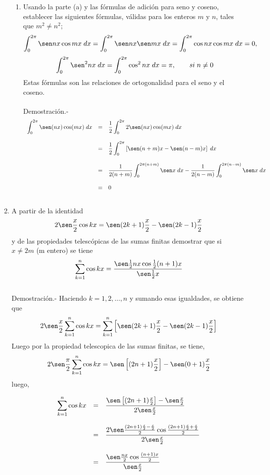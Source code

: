 \begin{enumerate}[\bfseries 1.]
\begin{enumerate}[\bfseries (a)]
    \item Usando la parte (a) y las fórmulas de adición para seno y coseno, establecer las siguientes fórmulas, válidas para los enteros $m$ y $n$, tales que $m^2 \neq n^2$;
	$$\int_0^{2\pi} \sen nx \cos mx \; dx = \int_0^{2\pi} \sen nx \sen mx \; dx = \int_0^{2\pi} \cos nx \cos mx \; dx = 0,$$
	$$\int_0^{2\pi} \sen^2 nx \; dx = \int_0^{2\pi} \cos^2 nx \; dx = \pi, \qquad si \; n\neq 0$$
	Estas fórmulas son las relaciones de ortogonalidad para el seno y el coseno.\\\\
	Demostración.-\; 
	$$\begin{array}{rcl}
	    \displaystyle\int_0^{2\pi} \sen(nx)\cos(mx)\; dx&=&\dfrac{1}{2}\displaystyle\int_0^{2\pi}2\sen(nx)\cos(mx)\; dx\\\\
							    &=&\dfrac{1}{2}\displaystyle\int_0^{2\pi} \left[\sen(n+m)x - \sen(n-m)x\right]\; dx\\\\
							    &=&\dfrac{1}{2(n+m)}\displaystyle\int_0^{2\pi(n+m)} \sen x\; dx - \dfrac{1}{2(n-m)}\displaystyle\int_0^{2\pi(n-m)} \sen x\; dx\\\\
							    &=&0\\\\
	\end{array}$$

\end{enumerate}

\item A partir de la identidad 
    $$2\sen \dfrac{x}{2} \cos kx = \sen(2k+1)\dfrac{x}{2} - \sen(2k-1)\dfrac{x}{2}$$
    y de las propiedades telescópicas de las sumas finitas demostrar que si $x\neq 2m$ (m entero) se tiene
    $$\sum_{k=1}^n \cos kx = \dfrac{\sen \frac{1}{2}nx\cos \frac{1}{2}(n+1)x}{\sen\frac{1}{2}x}$$\\
    Demostración.-\; Haciendo $k= 1,2,\ldots, n$ y sumando esas igualdades, se obtiene que
    $$2\sen \dfrac{x}{2} \sum_{k=1}^n \cos kx = \sum_{k=1}^n \left[\sen(2k+1)\dfrac{x}{2} - \sen(2k-1)\dfrac{x}{2}\right]$$
    Luego por la propiedad telescopica de las sumas finitas, se tiene, 
    $$2\sen\dfrac{\pi}{2}\sum\limits_{k=1}^n \cos kx = \sen \left[(2n+1)\dfrac{x}{2}\right]-\sen(0+1)\dfrac{x}{2}$$
    luego,

    $$\begin{array}{rcl}
	\displaystyle\sum_{k=1}^n \cos kx&=&\dfrac{\sen \left[(2n+1)\frac{x}{2}\right]-\sen\frac{x}{2}}{2\sen \frac{x}{2}}\\\\
					 &=&\dfrac{2\sen\frac{(2n+1)\frac{x}{2}-\frac{x}{2}}{2}\cos \frac{(2n+1)\frac{x}{2}+\frac{x}{2}}{2}}{2\sen\frac{x}{2}}\\\\
					 &=&\dfrac{\sen\frac{nx}{2}\cos\frac{(n+1)x}{2}}{\sen\frac{x}{2}}\\\\
    \end{array}$$


\end{enumerate}
